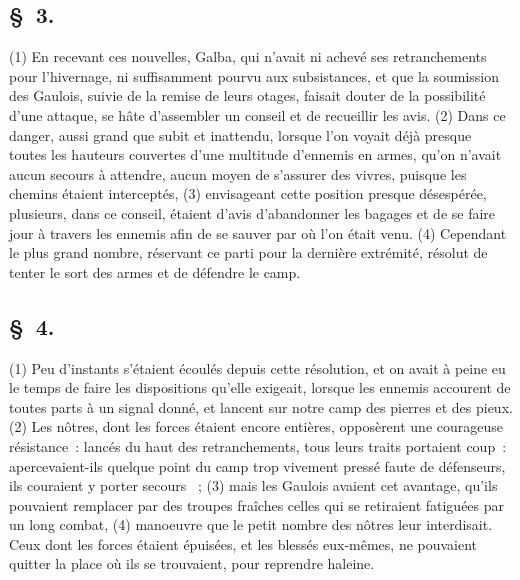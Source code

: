 \documentclass[french,twoside]{book} %
\begin{document}
\subsection[{§ 3.}]{ \textsc{§ 3.} }
\noindent (1) En recevant ces nouvelles, Galba, qui n’avait ni achevé ses retranchements pour l’hivernage, ni suffisamment pourvu aux subsistances, et que la soumission des Gaulois, suivie de la remise de leurs otages, faisait douter de la possibilité d’une attaque, se hâte d’assembler un conseil et de recueillir les avis. (2) Dans ce danger, aussi grand que subit et inattendu, lorsque l’on voyait déjà presque toutes les hauteurs couvertes d’une multitude d’ennemis en armes, qu’on n’avait aucun secours à attendre, aucun moyen de s’assurer des vivres, puisque les chemins étaient interceptés, (3) envisageant cette position presque désespérée, plusieurs, dans ce conseil, étaient d’avis d’abandonner les bagages et de se faire jour à travers les ennemis afin de se sauver par où l’on était venu. (4) Cependant le plus grand nombre, réservant ce parti pour la dernière extrémité, résolut de tenter le sort des armes et de défendre le camp.
\subsection[{§ 4.}]{ \textsc{§ 4.} }
\noindent (1) Peu d’instants s’étaient écoulés depuis cette résolution, et on avait à peine eu le temps de faire les dispositions qu’elle exigeait, lorsque les ennemis accourent de toutes parts à un signal donné, et lancent sur notre camp des pierres et des pieux. (2) Les nôtres, dont les forces étaient encore entières, opposèrent une courageuse résistance : lancés du haut des retranchements, tous leurs traits portaient coup : apercevaient-ils quelque point du camp trop vivement pressé faute de défenseurs, ils couraient y porter secours  ; (3) mais les Gaulois avaient cet avantage, qu’ils pouvaient remplacer par des troupes fraîches celles qui se retiraient fatiguées par un long combat, (4) manoeuvre que le petit nombre des nôtres leur interdisait. Ceux dont les forces étaient épuisées, et les blessés eux-mêmes, ne pouvaient quitter la place où ils se trouvaient, pour reprendre haleine.
\end{document}
